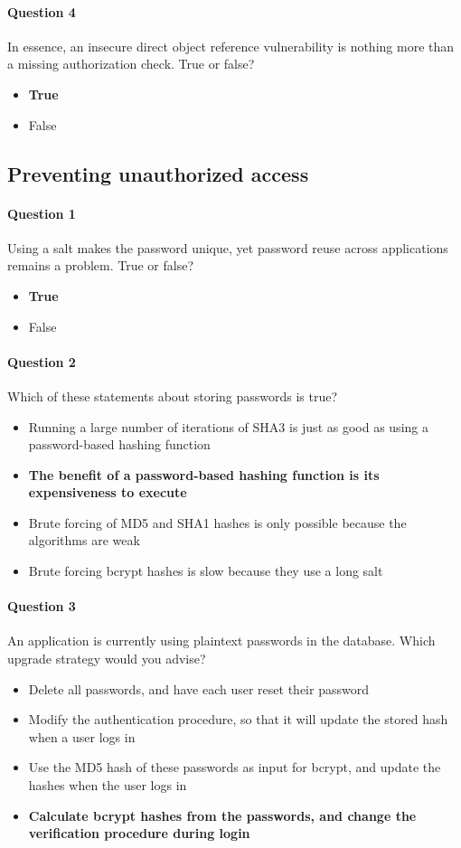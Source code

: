 \documentclass[titlepage]{article}
\begin{document}
    \paragraph{Question 4} In essence, an insecure direct object reference vulnerability is nothing more than a missing authorization check. True or false?
    \begin{itemize}
        \item \textbf{True} \checkmark
        \item False
    \end{itemize}
    \subsection{Preventing unauthorized access}
    \paragraph{Question 1} Using a salt makes the password unique, yet password reuse across applications remains a problem. True or false?
    \begin{itemize}
        \item \textbf{True} \checkmark
        \item False
    \end{itemize}
    \paragraph{Question 2} Which of these statements about storing passwords is true?
    \begin{itemize}
        \item Running a large number of iterations of SHA3 is just as good as using a password-based hashing function
        \item \textbf{The benefit of a password-based hashing function is its expensiveness to execute} \checkmark
        \item Brute forcing of MD5 and SHA1 hashes is only possible because the algorithms are weak
        \item Brute forcing bcrypt hashes is slow because they use a long salt
    \end{itemize}
    \paragraph{Question 3} An application is currently using plaintext passwords in the database. Which upgrade strategy would you advise?
    \begin{itemize}
        \item Delete all passwords, and have each user reset their password
        \item Modify the authentication procedure, so that it will update the stored hash when a user logs in
        \item Use the MD5 hash of these passwords as input for bcrypt, and update the hashes when the user logs in
        \item \textbf{Calculate bcrypt hashes from the passwords, and change the verification procedure during login} \checkmark
    \end{itemize}
\end{document}
